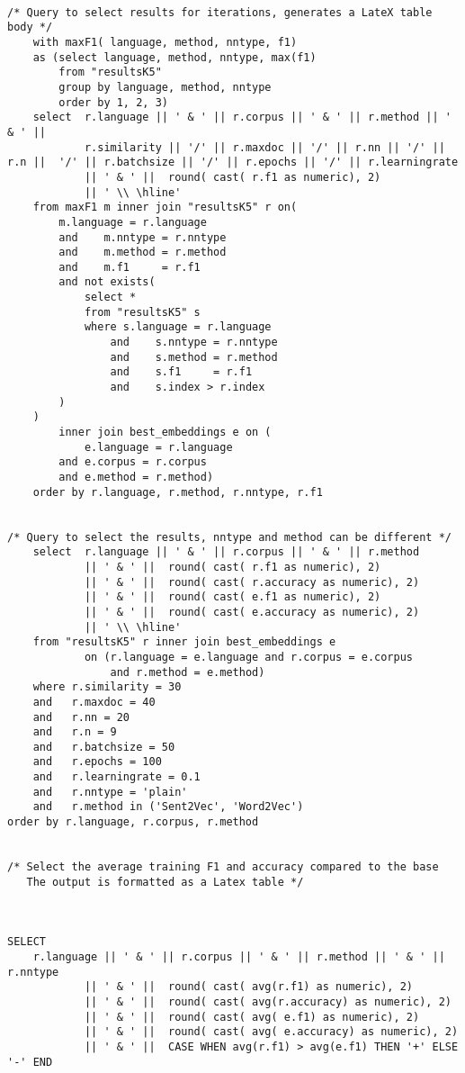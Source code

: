 \begin{verbatim}

/* Query to select results for iterations, generates a LateX table body */
    with maxF1( language, method, nntype, f1)
    as (select language, method, nntype, max(f1)
        from "resultsK5"
        group by language, method, nntype
        order by 1, 2, 3)
    select  r.language || ' & ' || r.corpus || ' & ' || r.method || ' & ' ||
            r.similarity || '/' || r.maxdoc || '/' || r.nn || '/' || r.n ||  '/' || r.batchsize || '/' || r.epochs || '/' || r.learningrate
            || ' & ' ||  round( cast( r.f1 as numeric), 2)
            || ' \\ \hline'
    from maxF1 m inner join "resultsK5" r on(
        m.language = r.language
        and    m.nntype = r.nntype
        and    m.method = r.method
        and    m.f1     = r.f1
        and not exists(
            select *
            from "resultsK5" s
            where s.language = r.language
                and    s.nntype = r.nntype
                and    s.method = r.method
                and    s.f1     = r.f1
                and    s.index > r.index
        )
    )
        inner join best_embeddings e on (
            e.language = r.language
        and e.corpus = r.corpus
        and e.method = r.method)
    order by r.language, r.method, r.nntype, r.f1


/* Query to select the results, nntype and method can be different */
    select  r.language || ' & ' || r.corpus || ' & ' || r.method
            || ' & ' ||  round( cast( r.f1 as numeric), 2)
            || ' & ' ||  round( cast( r.accuracy as numeric), 2)
            || ' & ' ||  round( cast( e.f1 as numeric), 2)
            || ' & ' ||  round( cast( e.accuracy as numeric), 2)
            || ' \\ \hline'
    from "resultsK5" r inner join best_embeddings e
            on (r.language = e.language and r.corpus = e.corpus
                and r.method = e.method)
    where r.similarity = 30
    and   r.maxdoc = 40
    and   r.nn = 20
    and   r.n = 9
    and   r.batchsize = 50
    and   r.epochs = 100
    and   r.learningrate = 0.1
    and   r.nntype = 'plain'
    and   r.method in ('Sent2Vec', 'Word2Vec')
order by r.language, r.corpus, r.method


/* Select the average training F1 and accuracy compared to the base 
   The output is formatted as a Latex table */



SELECT
    r.language || ' & ' || r.corpus || ' & ' || r.method || ' & ' || r.nntype
            || ' & ' ||  round( cast( avg(r.f1) as numeric), 2)
            || ' & ' ||  round( cast( avg(r.accuracy) as numeric), 2)
            || ' & ' ||  round( cast( avg( e.f1) as numeric), 2)
            || ' & ' ||  round( cast( avg( e.accuracy) as numeric), 2)
            || ' & ' ||  CASE WHEN avg(r.f1) > avg(e.f1) THEN '+' ELSE '-' END


\end{verbatim}
